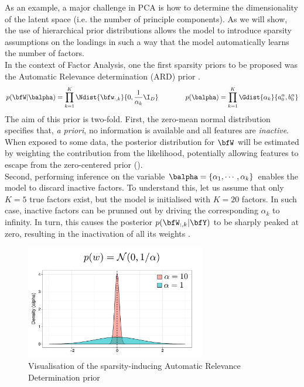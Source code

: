 As an example, a major challenge in PCA is how to determine the dimensionality of the latent space (i.e. the number of principle components). As we will show, the use of hierarchical prior distributions allows the model to introduce sparsity assumptions on the loadings in such a way that the model automatically learns the number of factors.\\
In the context of Factor Analysis, one the first sparsity priors to be proposed was the Automatic Relevance determination (ARD) prior \cite{Neal1995,Mackay1996,Bishop1999a,Bishop1999b}. 
\begin{equation*} \label{eq:ard}
	p(\bfW|\balpha) = \prod_{k=1}^{K} \Ndist{\bfw_{:,k}}{0,\frac{1}{\alpha_{k}}\I_{D}}\\
	\qquad\qquad
	p(\balpha) = \prod_{k=1}^{K} \Gdist{\alpha_k}{a_0^\alpha, b_0^\alpha}\\
\end{equation*}
The aim of this prior is two-fold. First, the zero-mean normal distribution specifies that, \textit{a priori}, no information is available and all features are \textit{inactive}. When exposed to some data, the posterior distribution for $\bfW$ will be estimated by weighting the contribution from the likelihood, potentially allowing features to escape from the zero-centered prior ().\\
Second, performing inference on the variable $\balpha = \{ \alpha_1, \cdots, \alpha_k \}$ enables the model to discard inactive factors. To understand this, let us assume that only $K=5$ true factors exist, but the model is initialised with $K=20$ factors. In such case, inactive factors can be prunned out by driving the corresponding $\alpha_k$ to infinity. In turn, this causes the posterior $p(\bfW_{:,k}|\bfY)$ to be sharply peaked at zero, resulting in the inactivation of all its weights .

\begin{figure}[H] \begin{center}
	\includegraphics[width=0.7\textwidth]{Chapter2/Figs/ard}
	\caption{Visualisation of the sparsity-inducing Automatic Relevance Determination prior}
	\label{fig:ard}
\end{center} \end{figure}

